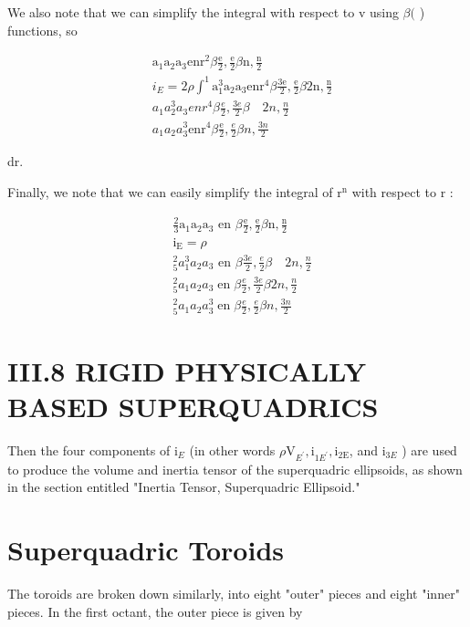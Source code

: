 We also note that we can simplify the integral with respect to v using $\beta($ ) functions, so

$$
\begin{aligned}
& \mathrm{a}_{1} \mathrm{a}_{2} \mathrm{a}_{3} \mathrm{enr}^{2} \beta \frac{\mathrm{e}}{2}, \frac{\mathrm{e}}{2} \beta \mathrm{n}, \frac{\mathrm{n}}{2} \\
& i_{E}=2 \rho \int^{1} \mathrm{a}_{1}^{3} \mathrm{a}_{2} \mathrm{a}_{3} \mathrm{enr}^{4} \beta \frac{3 \mathrm{e}}{2}, \frac{\mathrm{e}}{2} \beta 2 \mathrm{n}, \frac{\mathrm{n}}{2} \\
& a_{1} a_{2}^{3} a_{3} e n r^{4} \beta \frac{e}{2}, \frac{3 e}{2} \beta \quad 2 n, \frac{n}{2} \\
& a_{1} a_{2} a_{3}^{3} \mathrm{enr}^{4} \beta \frac{\mathrm{e}}{2}, \frac{e}{2} \beta n, \frac{3 n}{2}
\end{aligned}
$$

dr.

Finally, we note that we can easily simplify the integral of $\mathrm{r}^{\mathrm{n}}$ with respect to $\mathrm{r}$ :

$$
\begin{aligned}
& \frac{2}{3} \mathrm{a}_{1} \mathrm{a}_{2} \mathrm{a}_{3} \text { en } \beta \frac{\mathrm{e}}{2}, \frac{\mathrm{e}}{2} \beta \mathrm{n}, \frac{\mathrm{n}}{2} \\
& \mathrm{i}_{\mathrm{E}}=\rho \\
& { }_{5}^{2} a_{1}^{3} a_{2} a_{3} \text { en } \beta \frac{3 e}{2}, \frac{e}{2} \beta \quad 2 n, \frac{n}{2} \\
& { }_{5}^{2} a_{1} a_{2} a_{3} \operatorname{en} \beta \frac{e}{2}, \frac{3 e}{2} \beta 2 n, \frac{n}{2} \\
& { }_{5}^{2} a_{1} a_{2} a_{3}^{3} \operatorname{en} \beta \frac{e}{2}, \frac{e}{2} \beta n, \frac{3 n}{2} 
\end{aligned}
$$

\section{III.8 RIGID PHYSICALLY BASED SUPERQUADRICS}
Then the four components of $\mathrm{i}_{E}$ (in other words $\rho \mathrm{V}_{E^{\prime}}, \mathrm{i}_{1 E^{\prime}}, \mathrm{i}_{2 \mathrm{E}}$, and $\mathrm{i}_{3 E}$ ) are used to produce the volume and inertia tensor of the superquadric ellipsoids, as shown in the section entitled "Inertia Tensor, Superquadric Ellipsoid."

\section{Superquadric Toroids}
The toroids are broken down similarly, into eight "outer" pieces and eight "inner" pieces. In the first octant, the outer piece is given by

